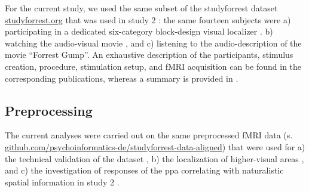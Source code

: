 

For the current study, we used the same subset of the studyforrest dataset
\href{http://www.studyforrest.org}{studyforrest.org} that was used in study 2
\citep{haeusler2022processing}:
%
the same fourteen subjects were
a) participating in a dedicated six-category block-design visual localizer
\citep{sengupta2016extension}.
b) watching the audio-visual movie \citep{hanke2016simultaneous}, and
c) listening to the audio-description \citep{hanke2014audiomovie} of the movie
``Forrest Gump''.
An exhaustive description of the participants, stimulus creation, procedure,
stimulation setup, and fMRI acquisition can be found in the corresponding
publications, whereas a summary is provided in \citep{haeusler2022processing}.


\subsection{Preprocessing}

The current analyses were carried out on the same preprocessed fMRI data (s.
\href{https://github.com/psychoinformatics-de/studyforrest-data-aligned
}{\url{github.com/psychoinformatics-de/studyforrest-data-aligned}}) that were
used for
%
a) the technical validation of the dataset \citep{hanke2016simultaneous},
%
b) the localization of higher-visual areas \citep{sengupta2016extension}, and
%
c) the investigation of responses of the \ac{ppa} correlating with naturalistic
spatial information in study 2 \citep{haeusler2022processing}.

